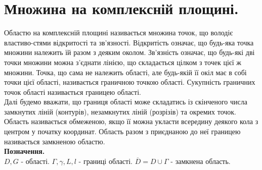 \section{Множина на комплексній площині.}
Областю на комплексній площині називається множина точок, що володіє властиво-стями відкритості та зв'язності. Відкритість означає, що будь-яка точка множини належить їй разом з деяким околом. Зв'язність означає, що будь-які дві точки множини можна з'єднати лінією, що складається цілком з точек цієї ж множини. Точка, що сама не належить області, але будь-якій її окіл має в собі точки цієї області, називається граничною точкою області. Сукупність граничних точок області називається границею області. \\Далі будемо вважати, що границя області може складатись із скінченого числа замкнутих ліній (контурів), незамкнутих ліній (розрізів) та окремих точок. Область називається обмеженою, якщо її можна укласти всередину деякого кола з центром у початку координат. Область разом з приєднаною до неї границею називається замкненою областю. \\
\textbf{Позначення. }\\$D,G$ - області. $\Gamma,\gamma,L,l$ - границі області. $\overline{D}=D\cup\Gamma$ - замкнена область.
\begin{figure*}[htp]\centering
	\tab 
\end{figure*}\\
